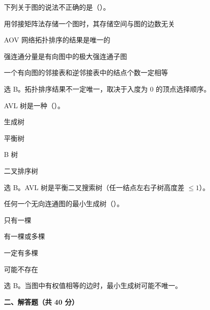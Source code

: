 \begin{question}
下列关于图的说法不正确的是（\quad）。
\begin{choiceoptions}[2]
  \item 用邻接矩阵法存储一个图时，其存储空间与图的边数无关
  \item AOV 网络拓扑排序的结果是唯一的
  \item 强连通分量是有向图中的极大强连通子图
  \item 一个有向图的邻接表和逆邻接表中的结点个数一定相等
\end{choiceoptions}
\begin{solution}
选 B。拓扑排序结果不一定唯一，取决于入度为 $0$ 的顶点选择顺序。
\end{solution}
\end{question}

\begin{question}
AVL 树是一种（\quad）。
\begin{choiceoptions}[2]
  \item 生成树
  \item 平衡树
  \item B 树
  \item 二叉排序树
\end{choiceoptions}
\begin{solution}
选 B。AVL 树是平衡二叉搜索树（任一结点左右子树高度差 $\le1$）。
\end{solution}
\end{question}

\begin{question}
任何一个无向连通图的最小生成树（\quad）。
\begin{choiceoptions}[2]
  \item 只有一棵
  \item 有一棵或多棵
  \item 一定有多棵
  \item 可能不存在
\end{choiceoptions}
\begin{solution}
选 B。当图中有权值相等的边时，最小生成树可能不唯一。
\end{solution}
\end{question}

\clearpage

\textbf{二、解答题（共 40 分）}

